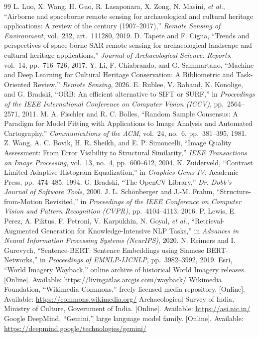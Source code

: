 \documentclass[a4paper,12pt,oneside]{book}
\begin{document}
\begin{thebibliography}{99}
 L. Luo, X. Wang, H. Guo, R. Lasaponara, X. Zong, N. Masini, \emph{et al.}, ``Airborne and spaceborne remote sensing for archaeological and cultural heritage applications: A review of the century (1907--2017),'' \emph{Remote Sensing of Environment}, vol.~232, art.~111280, 2019.
 D. Tapete and F. Cigna, ``Trends and perspectives of space-borne SAR remote sensing for archaeological landscape and cultural heritage applications,'' \emph{Journal of Archaeological Science: Reports}, vol.~14, pp.~716--726, 2017.
 Y. Li, F. Chiabrando, and G. Sammartano, ``Machine and Deep Learning for Cultural Heritage Conservation: A Bibliometric and Task-Oriented Review,'' \emph{Remote Sensing}, 2026.
 E. Rublee, V. Rabaud, K. Konolige, and G. Bradski, ``ORB: An efficient alternative to SIFT or SURF,'' in \emph{Proceedings of the IEEE International Conference on Computer Vision (ICCV)}, pp.~2564--2571, 2011.
 M. A. Fischler and R. C. Bolles, ``Random Sample Consensus: A Paradigm for Model Fitting with Applications to Image Analysis and Automated Cartography,'' \emph{Communications of the ACM}, vol.~24, no.~6, pp.~381--395, 1981.
 Z. Wang, A. C. Bovik, H. R. Sheikh, and E. P. Simoncelli, ``Image Quality Assessment: From Error Visibility to Structural Similarity,'' \emph{IEEE Transactions on Image Processing}, vol.~13, no.~4, pp.~600--612, 2004.
 K. Zuiderveld, ``Contrast Limited Adaptive Histogram Equalization,'' in \emph{Graphics Gems IV}, Academic Press, pp.~474--485, 1994.
 G. Bradski, ``The OpenCV Library,'' \emph{Dr. Dobb's Journal of Software Tools}, 2000.
 J. L. Sch\"onberger and J.-M. Frahm, ``Structure-from-Motion Revisited,'' in \emph{Proceedings of the IEEE Conference on Computer Vision and Pattern Recognition (CVPR)}, pp.~4104--4113, 2016.
 P. Lewis, E. Perez, A. Piktus, F. Petroni, V. Karpukhin, N. Goyal, \emph{et al.}, ``Retrieval-Augmented Generation for Knowledge-Intensive NLP Tasks,'' in \emph{Advances in Neural Information Processing Systems (NeurIPS)}, 2020.
 N. Reimers and I. Gurevych, ``Sentence-BERT: Sentence Embeddings using Siamese BERT-Networks,'' in \emph{Proceedings of EMNLP-IJCNLP}, pp.~3982--3992, 2019.
 Esri, ``World Imagery Wayback,'' online archive of historical World Imagery releases. [Online]. Available: \url{https://livingatlas.arcgis.com/wayback/}
 Wikimedia Foundation, ``Wikimedia Commons,'' freely licensed media repository. [Online]. Available: \url{https://commons.wikimedia.org/}
 Archaeological Survey of India, Ministry of Culture, Government of India. [Online]. Available: \url{https://asi.nic.in/}
 Google DeepMind, ``Gemini,'' large language model family. [Online]. Available: \url{https://deepmind.google/technologies/gemini/}
\end{thebibliography}
\end{document}
